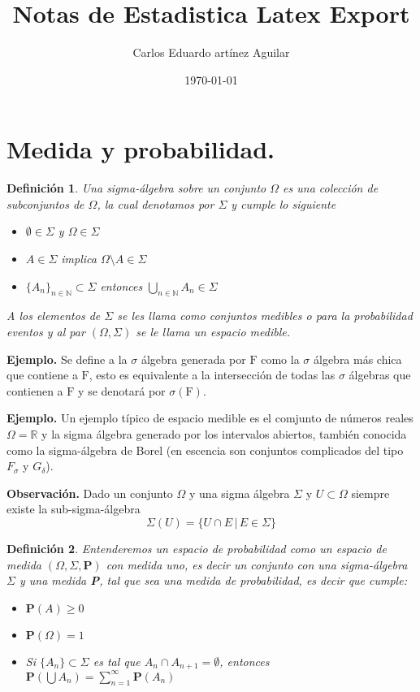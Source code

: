 \documentclass[letterpaper]{article}
\author{Carlos Eduardo artínez Aguilar}
\date{\today}
\title{Notas de Estadistica Latex Export}
\newtheorem{def.}{Definici\'on}[section]
\newcommand{\nat}{\ensuremath{ \mathbb N }}
\newcommand{\eje}{{\newline \noindent \sc \textbf{Ejemplo. }}}
\newcommand{\obs}{{\newline \noindent \sc \textbf{Observación. }}}
\newcommand{\re}{\ensuremath{\mathbb R }}
\begin{document}
\maketitle
\tableofcontents

\section{Medida y probabilidad.}
\label{sec:orgb769115}

\begin{def.}
Una \emph{sigma-álgebra} sobre un conjunto \(\Omega\) es una colección de subconjuntos de \(\Omega\), la cual denotamos por \(\Sigma\) y cumple lo siguiente
\begin{itemize}
\item \(\emptyset\in\Sigma\) y \(\Omega\in\Sigma\)
\item \(A\in\Sigma\) implica \(\Omega\setminus A\in\Sigma\)
\item \(\{A_n\}_{n\in\nat}\subset\Sigma\) entonces \(\bigcup_{n\in\nat} A_n\in\Sigma\)
\end{itemize}
A los elementos de \(\Sigma\) se les llama como \emph{conjuntos medibles} o para la probabilidad \emph{eventos} y al par \((\Omega,\Sigma)\) se le llama un espacio medible.
\end{def.}

\eje Se define a la \(\sigma\) álgebra generada por \(\mathrm{F}\) como la \(\sigma\) álgebra más chica que contiene a \(\mathrm{F}\), esto es equivalente a la intersección de todas las \(\sigma\) álgebras que contienen a \(\mathrm{F}\) y se denotará por \(\sigma(\mathrm{F})\).

\eje Un ejemplo típico de espacio medible es el comjunto de números reales \(\Omega=\re\) y la sigma álgebra generado por los intervalos abiertos, también conocida como la sigma-álgebra de Borel (en escencia son conjuntos complicados del tipo \(F_{\sigma}\) y \(G_{\delta}\)).

\obs Dado un conjunto \(\Omega\) y una sigma álgebra \(\Sigma\) y \(U\subset\Omega\) siempre existe la sub-sigma-álgebra
\[
    \Sigma(U)=\{U\cap E\,|\,E\in\Sigma\}
\]

\begin{def.}
\noindent Entenderemos un \emph{espacio de probabilidad} como un espacio de medida \((\Omega,\Sigma,\textbf{P})\) con medida uno, es decir un conjunto con una \emph{sigma-álgebra} \(\Sigma\) y una medida \textbf{P}, tal que sea una medida de probabilidad, es decir que cumple:

\begin{itemize}
\item \(\textbf{P}(A)\geq 0\)
\item \(\textbf{P}(\Omega)=1\)
\item Si \(\{A_n\}\subset\Sigma\) es tal que \(A_n\cap A_{n+1}=\emptyset\), entonces \(\textbf{P}(\bigcup A_n)=\sum_{n=1}^{\infty} \textbf{P}(A_n)\)
\end{itemize}
\end{def.}
\end{document}
